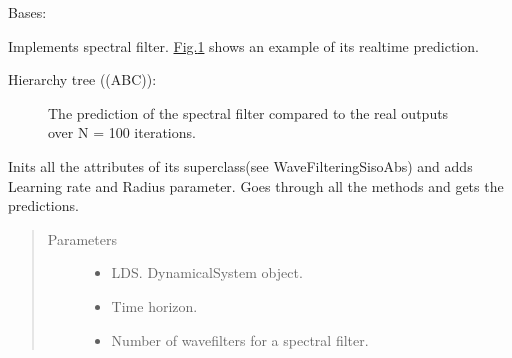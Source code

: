 \documentclass[letterpaper,10pt,english]{sphinxmanual}
\begin{document}
\begin{fulllineitems}
\label{\detokenize{LDS.LDS.filters:LDS.LDS.filters.wave_filtering_siso.WaveFilteringSISO}}
\sphinxAtStartPar
Bases: {\hyperref[\detokenize{LDS.LDS.filters:LDS.LDS.filters.wave_filtering_siso_abs.WaveFilteringSisoAbs}]{}}

\sphinxAtStartPar
Implements spectral filter. \hyperref[\detokenize{LDS.LDS.filters:spectral}]{Fig.\@ \ref{\detokenize{LDS.LDS.filters:spectral}}} shows an example of its real\sphinxhyphen{}time prediction.

\sphinxAtStartPar
Hierarchy tree ((ABC)):

\noindent{}

\begin{figure}[htbp]
\centering
\capstart

\noindent{}
\caption{The prediction of the spectral filter compared to the real outputs over N = 100 iterations.}\label{\detokenize{LDS.LDS.filters:id2}}\label{\detokenize{LDS.LDS.filters:spectral}}\end{figure}

\sphinxAtStartPar
Inits all the attributes of its superclass(see WaveFilteringSisoAbs) and
adds Learning rate and Radius parameter.
Goes through all the methods and gets the predictions.
\begin{quote}\begin{description}
\item[{Parameters}] \leavevmode\begin{itemize}
\item {} 
\sphinxAtStartPar
{} \textendash{} LDS. DynamicalSystem object.

\item {} 
\sphinxAtStartPar
{} \textendash{} Time horizon.

\item {} 
\sphinxAtStartPar
{} \textendash{} Number of wave\sphinxhyphen{}filters for a spectral filter.


\end{itemize}
\end{description}
\end{quote}
\end{fulllineitems}
\end{document}
